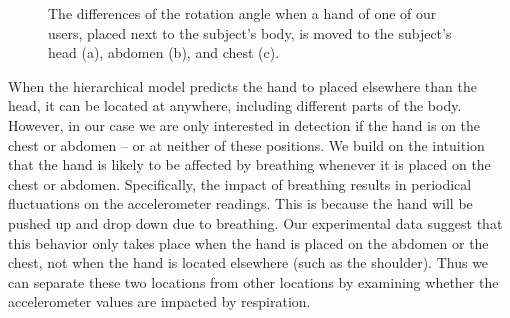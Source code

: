\begin{figure}[!t]
	\centering
	\caption{The differences of the rotation angle when a hand of one of our users, placed next to the subject's body, is moved to the subject's head (a), abdomen (b), and chest (c). }\label{Bodyhand}
\end{figure}



 {When the hierarchical model predicts the hand to placed elsewhere than the head, it can
be located at anywhere, including different parts of the body. {However, in our case we are only interested in detection if the hand is on
the chest or abdomen -- or at neither of these positions.} We build on the intuition that the hand is likely to be affected by breathing
whenever it is placed on the chest or abdomen.} Specifically, the impact of breathing results in periodical fluctuations on the
accelerometer readings. This is because the hand will be pushed up and drop down due to breathing.  {Our experimental data suggest that
this behavior only takes place when the hand is placed on the abdomen or the chest, not when the hand is located elsewhere (such as the
shoulder). Thus we can separate these two locations from other locations by examining whether the accelerometer values are impacted by
respiration.}

